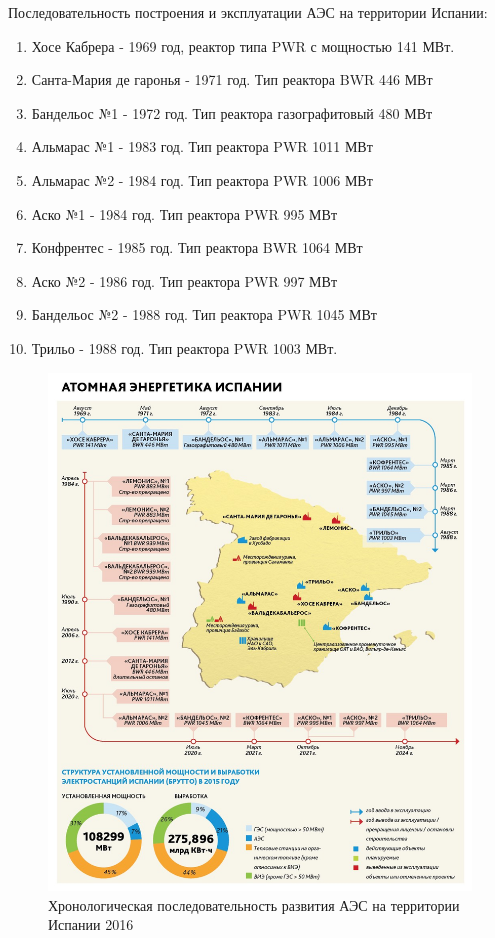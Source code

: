 Последовательность построения и эксплуатации АЭС на территории Испании:
\begin{enumerate}
	\item Хосе Кабрера - 1969 год, реактор типа PWR с мощностью 141 МВт.
	\item Санта-Мария де гаронья - 1971 год. Тип реактора BWR 446 МВт
	\item Бандельос  №1 - 1972 год. Тип реактора газографитовый  480 МВт
	\item Альмарас №1 - 1983 год. Тип реактора PWR 1011 МВт
	\item Альмарас №2 - 1984 год. Тип реактора PWR 1006 МВт
	\item Аско №1 - 1984 год. Тип реактора PWR 995 МВт
	\item Конфрентес - 1985 год. Тип реактора BWR 1064 МВт
	\item Аско №2 - 1986 год. Тип реактора PWR 997 МВт
	\item Бандельос №2 - 1988 год. Тип реактора PWR 1045 МВт
	\item Трильо - 1988 год. Тип реактора PWR 1003 МВт.   
\end{enumerate}

\begin{figure}[h]
	\begin{center}
		\includegraphics[width=.5\columnwidth]{./img/spain_en_history.jpg}
	\end{center}
	\caption{Хронологическая последовательность развития АЭС на территории Испании 2016}
	\label{pic:spain_en_history}
\end{figure}